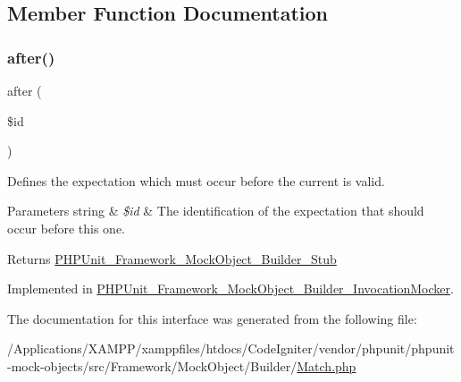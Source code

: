 \subsection{Member Function Documentation}
\mbox{\label{interface_p_h_p_unit___framework___mock_object___builder___match_a02176c9b6e2cdc241de069df4423a683}} 
\subsubsection{\texorpdfstring{after()}{after()}}
{\footnotesize\ttfamily after (\begin{DoxyParamCaption}\item[{}]{\$id }\end{DoxyParamCaption})}

Defines the expectation which must occur before the current is valid.


\begin{DoxyParams}[1]{Parameters}
string & {\em \$id} & The identification of the expectation that should occur before this one.\\
\hline
\end{DoxyParams}
\begin{DoxyReturn}{Returns}
\mbox{\hyperlink{interface_p_h_p_unit___framework___mock_object___builder___stub}{P\+H\+P\+Unit\+\_\+\+Framework\+\_\+\+Mock\+Object\+\_\+\+Builder\+\_\+\+Stub}} 
\end{DoxyReturn}


Implemented in \mbox{\hyperlink{class_p_h_p_unit___framework___mock_object___builder___invocation_mocker_a02176c9b6e2cdc241de069df4423a683}{P\+H\+P\+Unit\+\_\+\+Framework\+\_\+\+Mock\+Object\+\_\+\+Builder\+\_\+\+Invocation\+Mocker}}.



The documentation for this interface was generated from the following file\+:\begin{DoxyCompactItemize}
\item 
/\+Applications/\+X\+A\+M\+P\+P/xamppfiles/htdocs/\+Code\+Igniter/vendor/phpunit/phpunit-\/mock-\/objects/src/\+Framework/\+Mock\+Object/\+Builder/\mbox{\hyperlink{_match_8php}{Match.\+php}}\end{DoxyCompactItemize}

